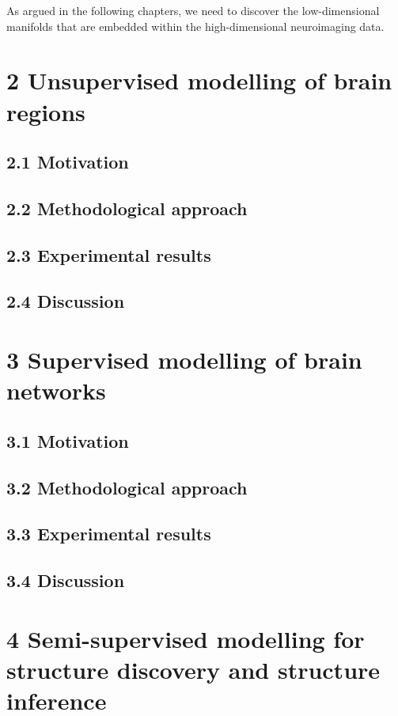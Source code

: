 \documentclass[authoryear,review,3p]{elsarticle}
\begin{document}
As argued in the following chapters,
we need to discover
the low-dimensional manifolds that are
embedded within the high-dimensional neuroimaging data.



\section*{2 Unsupervised modelling of brain regions}

\subsection*{2.1 Motivation}
\subsection*{2.2 Methodological approach}
\subsection*{2.3 Experimental results}
\subsection*{2.4 Discussion}



\section*{3 Supervised modelling of brain networks}

\subsection*{3.1 Motivation}
\subsection*{3.2 Methodological approach}
\subsection*{3.3 Experimental results}
\subsection*{3.4 Discussion}


\section*{4 Semi-supervised modelling for structure discovery
and structure inference}
\end{document}
